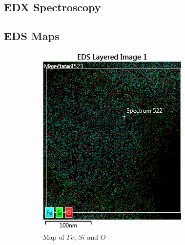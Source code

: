 \documentclass[12pt,a4paper]{article}
\begin{document}

\subsection{EDX Spectroscopy} %
\label{sub:edx_spectroscopy}




\subsection{EDS Maps} %
\label{sub:eds_maps}

\begin{figure}
  \centering
  \begin{subfigure}[b]{0.35\textwidth}
    \includegraphics[width=\textwidth]{Data/Map.png}
    \caption{Map of $Fe$, $Si$ and $O$}
    \label{fig:map}
  \end{subfigure}
  \begin{subfigure}[b]{0.35\textwidth}

\end{subfigure}
\end{figure}
\end{document}
